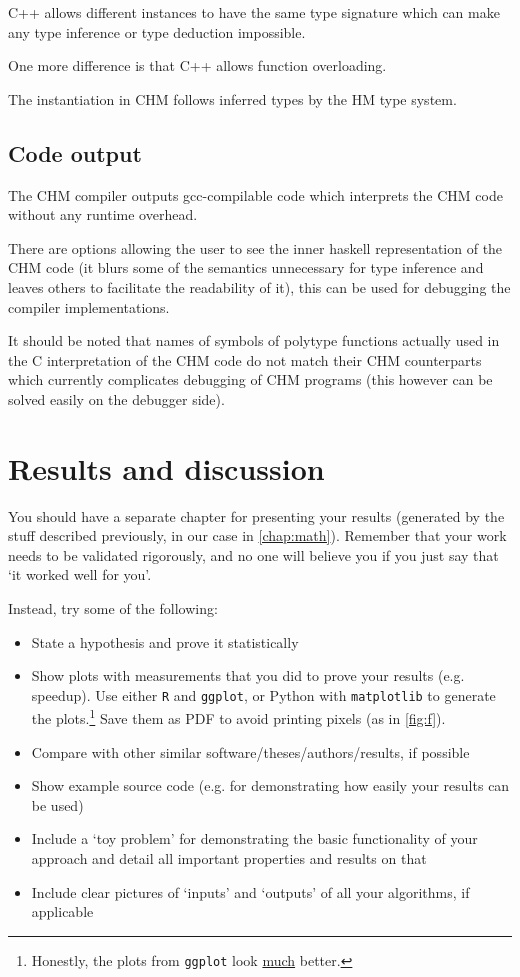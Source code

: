C++ allows different instances to have the same type signature which can make any type inference or type deduction
impossible.

One more difference is that C++ allows function overloading. %

The instantiation in CHM follows inferred types by the HM type system.

\section{Code output}

The CHM compiler outputs gcc-compilable code which interprets the CHM code without any runtime overhead. %

There are options allowing the user to see the inner haskell representation of the CHM code (it blurs some of the semantics
unnecessary for type inference and leaves others to facilitate the readability of it), this can be used for debugging
the compiler implementations. %

It should be noted that names of symbols of polytype functions actually used in the C interpretation of the CHM code do not match
their CHM counterparts which currently complicates debugging of CHM programs (this however can be solved easily on the debugger side).

\chapter{Results and discussion}

You should have a separate chapter for presenting your results (generated by the stuff described previously, in our case in \cref{chap:math}). Remember that your work needs to be validated rigorously, and no one will believe you if you just say that `it worked well for you'.

Instead, try some of the following:
\begin{itemize}
\item State a hypothesis and prove it statistically
\item Show plots with measurements that you did to prove your results (e.g. speedup). Use either \texttt{R} and \texttt{ggplot}, or Python with \texttt{matplotlib} to generate the plots.\footnote{Honestly, the plots from \texttt{ggplot} look \underline{much} better.} Save them as PDF to avoid printing pixels (as in \cref{fig:f}).
\item Compare with other similar software/theses/authors/results, if possible
\item Show example source code (e.g. for demonstrating how easily your results can be used)
\item Include a `toy problem' for demonstrating the basic functionality of your approach and detail all important properties and results on that
\item Include clear pictures of `inputs' and `outputs' of all your algorithms, if applicable
\end{itemize}

